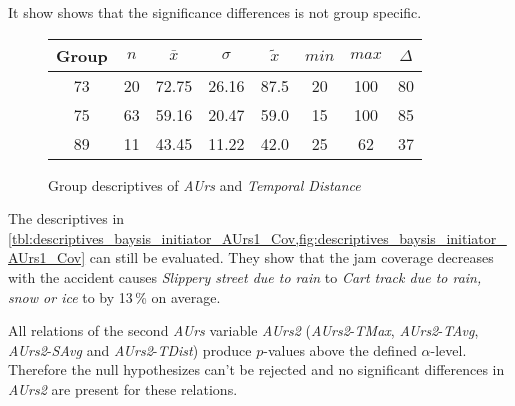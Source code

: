 It show shows that the significance differences is not group specific.
\begin{figure}[ht!]
	\centering
	\begin{minipage}{0.5\textwidth}
		\tiny
		\setlength{\tabcolsep}{4pt}
		\centering
		\begin{tabular}{c|c|c|c|c|c|c|c}
			\toprule
			Group & $n$ & $\bar{x}$ & $\sigma$ & $\tilde{x}$ & $min$ & $max$ & $\Delta$ \\
			\midrule
			73 & 20 & 72.75 & 26.16 & 87.5 & 20 & 100 & 80 \\ 
			75 & 63 & 59.16 & 20.47 & 59.0 & 15 & 100 & 85 \\ 
			89 & 11 & 43.45 & 11.22 & 42.0 & 25 & 62  & 37 \\ 
			\bottomrule
		\end{tabular}
		\label{tbl:descriptives_baysis_initiator_AUrs1_Cov}
	\end{minipage}%
	\begin{minipage}{0.55\textwidth}
		\data 
        \pgfplotstablesort[sort key=mean, sort cmp=float >]{\datasorted}{\data}
        \tiny
        \centering
		\label{fig:descriptives_baysis_initiator_AUrs1_Cov}
	\end{minipage}%
	\caption{Group descriptives of \textit{AUrs} and \textit{Temporal Distance}}
\end{figure}
The descriptives in \cref{tbl:descriptives_baysis_initiator_AUrs1_Cov,fig:descriptives_baysis_initiator_AUrs1_Cov} can still be evaluated. They show that the jam coverage decreases with the accident causes \textit{Slippery street due to rain} to \textit{Cart track due to rain, snow or ice} to by 13\,\% on average.

\medskip
All relations of the second \textit{AUrs} variable \textit{AUrs2} (\textit{AUrs2}-\textit{TMax}, \textit{AUrs2}-\textit{TAvg}, \textit{AUrs2}-\textit{SAvg} and \textit{AUrs2}-\textit{TDist}) produce $p$-values above the defined $\alpha$-level. Therefore the null hypothesizes can't be rejected and no significant differences in \textit{AUrs2} are present for these relations.

